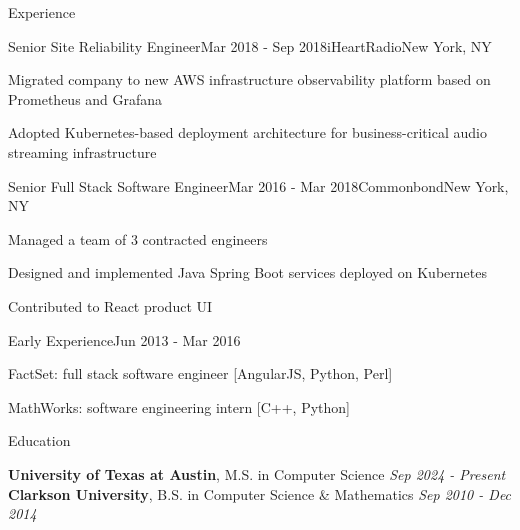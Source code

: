 \documentclass[
	10pt, %
]{resume} %
\begin{document}
\begin{rSection}{Experience}

    \begin{rSubsection}{Senior Site Reliability Engineer}{Mar 2018 - Sep 2018}{iHeartRadio}{New York, NY}
        \item Migrated company to new AWS infrastructure observability platform based on Prometheus and Grafana
        \item Adopted Kubernetes-based deployment architecture for business-critical audio streaming infrastructure
    \end{rSubsection}


    \begin{rSubsection}{Senior Full Stack Software Engineer}{Mar 2016 - Mar 2018}{Commonbond}{New York, NY}
        \item Managed a team of 3 contracted engineers
        \item Designed and implemented Java Spring Boot services deployed on Kubernetes
        \item Contributed to React product UI
    \end{rSubsection}
    

    \begin{rSubsection}{Early Experience}{Jun 2013 - Mar 2016}{}{}
        \item FactSet: full stack software engineer [AngularJS, Python, Perl]
        \item MathWorks: software engineering intern [C++, Python]
    \end{rSubsection}
    
\end{rSection}


\begin{rSection}{Education}

    \textbf{University of Texas at Austin}, M.S. in Computer Science \hfill \textit{Sep 2024 - Present} \\ 

    \textbf{Clarkson University}, B.S. in Computer Science \& Mathematics \hfill \textit{Sep 2010 - Dec 2014} \\
	
\end{rSection}
\end{document}
